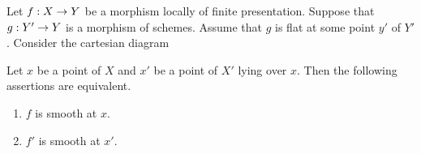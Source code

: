 \begin{theorem}\label{theorem:faithfuly_flat_descent_for_smooth_morphisms}
Let $f:X\rightarrow Y$ be a morphism locally of finite presentation. Suppose that $g:Y'\rightarrow Y$ is a morphism of schemes. Assume that $g$ is flat at some point $y'$ of $Y'$. Consider the cartesian diagram
\begin{center}
\end{center} 
Let $x$ be a point of $X$ and $x'$ be a point of $X'$ lying over $x$. Then the following assertions are equivalent.
\begin{enumerate}[label=\emph{\textbf{(\roman*)}}, leftmargin=3.0em]
\item $f$ is smooth at $x$.
\item $f'$ is smooth at $x'$.
\end{enumerate}
\end{theorem}
